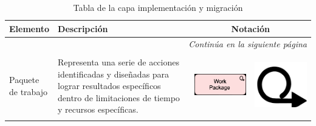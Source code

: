 \begin{longtable}{|p{0.15\linewidth}|p{0.45\linewidth}|p{0.2\linewidth} p{0.2\linewidth}|}
   \caption{Tabla de la capa implementación y migración}
   \\
   \hline
   \rowcolor[HTML]{AFC5F6} 
   \textbf{Elemento} & \textbf{Descripción} & \multicolumn{2}{c|}{\textbf{Notación}} \\
   \hline
   \endhead
   \hline
   \multicolumn{4}{r}{\textit{Continúa en la siguiente página}} \\
   \endfoot
   \hline
   \endlastfoot
   \label{tab:Tabla de la capa implementación y migración}



   Paquete de trabajo 
   &
   Representa una serie de acciones identificadas y diseñadas para lograr resultados específicos dentro de limitaciones de tiempo y recursos específicas. 
   &
\begin{center}
   \includegraphics[width=1\linewidth]{imgs/capa_migracion/1.pdf}
\end{center} 
&
\begin{center}
   \includegraphics[width=0.5\linewidth]{imgs/capa_migracion/a1.pdf}
\end{center}
   \\ \hline




\end{longtable}
